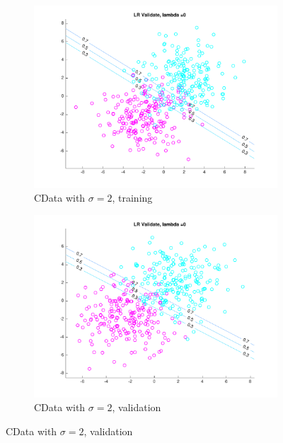 \begin{figure}[h!]
    \begin{subfigure}[b]{0.4\textwidth}
	\includegraphics[scale=0.4]{hw2_1_stdev2_a_0.pdf}
	\caption{CData with $\sigma = 2$, training}\label{fig:data_stdev2a}
	\end{subfigure}
	\quad	
	\begin{subfigure}[b]{0.4\textwidth}
	\includegraphics[scale=0.4]{hw2_1_stdev2_b_0.pdf}
	\caption{CData with $\sigma = 2$, validation}\label{fig:data_stdev2b}
	\end{subfigure}
    

\end{figure}
